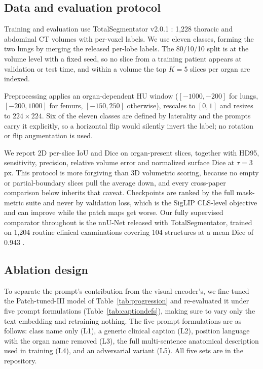 \documentclass[10pt]{article}
\begin{document}
\subsection{Data and evaluation protocol}
\label{sec:methods:data}

Training and evaluation use TotalSegmentator v2.0.1
\cite{wasserthal2023totalsegdataset}: 1{,}228 thoracic and abdominal CT volumes
with per-voxel labels. We use eleven classes, forming the two lungs by merging the
released per-lobe labels. The 80/10/10 split is at the volume level with a fixed
seed, so no slice from a training patient appears at validation or test time, and
within a volume the top $K=5$ slices per organ are indexed.

Preprocessing applies an organ-dependent HU window ($[-1000,-200]$ for lungs,
$[-200,1000]$ for femurs, $[-150,250]$ otherwise), rescales to $[0,1]$ and resizes
to $224\times224$. Six of the eleven classes are defined by laterality and the
prompts carry it explicitly, so a horizontal flip would silently invert the label;
no rotation or flip augmentation is used.

We report 2D per-slice IoU and Dice on organ-present slices, together with HD95,
sensitivity, precision, relative volume error and normalized surface Dice
\cite{nikolov2021nsd} at $\tau=3$\,px. This protocol is more forgiving than 3D
volumetric scoring, because no empty or partial-boundary slices pull the average
down, and every cross-paper comparison below inherits that caveat. Checkpoints are
ranked by the full mask-metric suite and never by validation loss, which is the
SigLIP CLS-level objective and can improve while the patch maps get worse. Our
fully supervised comparator throughout is the nnU-Net \cite{isensee2021nnunet}
released with TotalSegmentator, trained on 1{,}204 routine clinical examinations
covering 104 structures at a mean Dice of 0.943
\cite{wasserthal2023totalsegmentator}.

\subsection{Ablation design}
\label{sec:methods:captions}

To separate the prompt's contribution from the visual encoder's, we fine-tuned the Patch-tuned-III model of Table~\ref{tab:progression} and re-evaluated it under five prompt formulations (Table~\ref{tab:captiondefs}), making sure to vary only the text embedding and retraining nothing. The five prompt formulations are as follows: class name only (L1), a generic clinical caption (L2), position language with the organ name
removed (L3), the full multi-sentence anatomical description used in training (L4), and an adversarial variant (L5). All five sets are in the repository.
\end{document}
